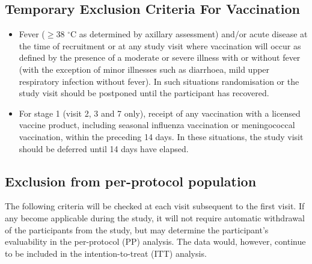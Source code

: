 \documentclass{bmcart}
\begin{document}
\subsection*{Temporary Exclusion Criteria For Vaccination}


\begin{itemize}
	\item Fever ($\geq$38 $^{\circ}$C as determined by axillary assessment) and/or acute disease at the time of recruitment or at any study visit where vaccination will occur as defined by the presence of a moderate or severe illness with or without fever (with the exception of minor illnesses such as diarrhoea, mild upper respiratory infection without fever). In such situations randomisation or the study visit should be postponed until the participant has recovered.
	\item For stage 1 (visit 2, 3 and 7 only), receipt of any vaccination with a licensed vaccine product, including seasonal influenza vaccination or meningococcal vaccination, within the preceding 14 days. In these situations, the study visit should be deferred until 14 days have elapsed.
\end{itemize}

\subsection*{Exclusion from per-protocol population}

The following criteria will be checked at each visit subsequent to the first visit.
If any become applicable during the study, it will not require automatic withdrawal of the participants from the study, but may determine the participant's evaluability in the per-protocol (PP) analysis.
The data would, however, continue to be included in the intention-to-treat (ITT) analysis.
\end{document}
